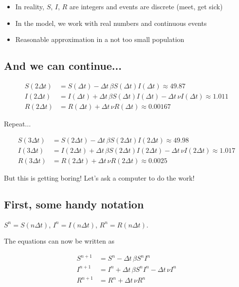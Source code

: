 \documentclass[%
twoside,                 %
final,                   %
10pt]{article}
\begin{document}
\begin{itemize}
 \item In reality, $S$, $I$, $R$ are integers and events are discrete (meet, get sick)

 \item In the model, we work with real numbers and continuous events

 \item Reasonable approximation in a not too small population
\end{itemize}

\noindent

\subsection{And we can continue...}

\begin{align*}
S(2\Delta t) &= S(\Delta t) - \Delta t\,\beta S(\Delta t)I(\Delta t)\approx 49.87\\
I(2\Delta t) &= I(\Delta t) + \Delta t\,\beta S(\Delta t)I(\Delta t) -\Delta t\,\nu I(\Delta t)\approx 1.011\\
R(2\Delta t) &= R(\Delta t) + \Delta t\,\nu R(\Delta t)\approx 0.00167
\end{align*}

Repeat...

\begin{align*}
S(3\Delta t) &= S(2\Delta t) - \Delta t\,\beta S(2\Delta t)I(2\Delta t)\approx 49.98\\
I(3\Delta t) &= I(2\Delta t) + \Delta t\,\beta S(2\Delta t)I(2\Delta t) -\Delta t\,\nu I(2\Delta t)\approx 1.017\\
R(3\Delta t) &= R(2\Delta t) + \Delta t\,\nu R(2\Delta t)\approx 0.0025
\end{align*}

But this is getting boring! Let's ask a computer to do the work!



\subsection{First, some handy notation}

$S^n = S(n\Delta t)$,
$I^n = I(n\Delta t)$, $R^n = R(n\Delta t)$.

The equations can now be written as

\begin{align}
S^{n+1} &= S^n - \Delta t\,\beta S^nI^n
\label{SIR1:Sc}\\
I^{n+1} &= I^n + \Delta t\,\beta S^nI^n -\Delta t\,\nu I^n
\label{SIR1:Ic}\\
R^{n+1} &= R^n + \Delta t\,\nu R^n
\label{SIR1:Rc}
\end{align}
\end{document}
